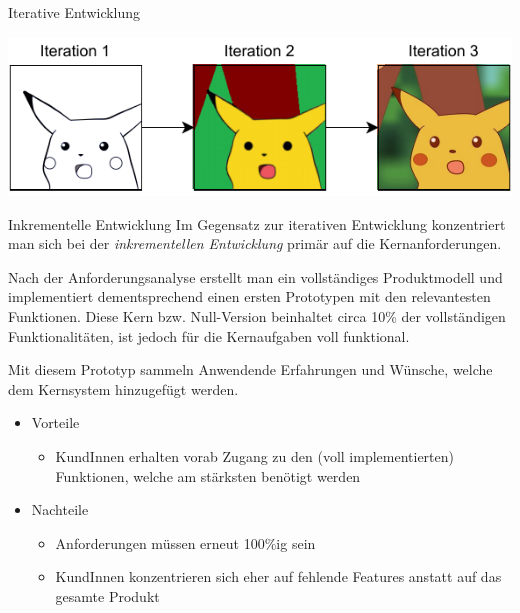 \begin{example}{Iterative Entwicklung}
    \begin{center}
        \includegraphics{includes/figures/example_iterative_development.pdf}
    \end{center}
\end{example}

\begin{defi}{Inkrementelle Entwicklung}
    Im Gegensatz zur iterativen Entwicklung konzentriert man sich bei der \emph{inkrementellen Entwicklung} primär auf die Kernanforderungen.

    Nach der Anforderungsanalyse erstellt man ein vollständiges Produktmodell und implementiert dementsprechend einen ersten Prototypen mit den relevantesten Funktionen.
    Diese Kern bzw. Null-Version beinhaltet circa 10\% der vollständigen Funktionalitäten, ist jedoch für die Kernaufgaben voll funktional.

    Mit diesem Prototyp sammeln Anwendende Erfahrungen und Wünsche, welche dem Kernsystem hinzugefügt werden.

    \begin{itemize}
        \item Vorteile
              \begin{itemize}
                  \item KundInnen erhalten vorab Zugang zu den (voll implementierten) Funktionen, welche am stärksten benötigt werden
              \end{itemize}
        \item Nachteile
              \begin{itemize}
                  \item Anforderungen müssen erneut 100\%ig sein
                  \item KundInnen konzentrieren sich eher auf fehlende Features anstatt auf das gesamte Produkt
              \end{itemize}
    \end{itemize}
\end{defi}

